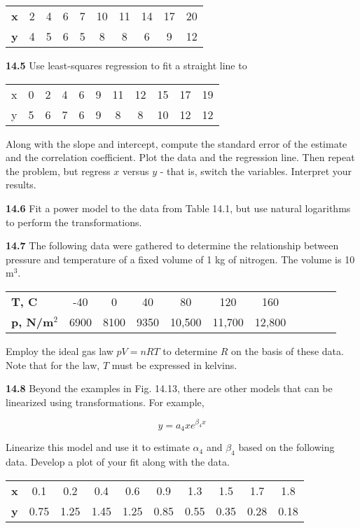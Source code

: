 \documentclass[../main.tex]{subfiles}
\begin{document}
\begin{multicols}{2}
	\noindent \begin{tabular}{c c c c c c c c c c }
	 	\textbf{x} & 2 & 4 & 6 & 7 & 10 & 11 & 		14 & 		17 & 		20 \\
	  	\textbf{y} & 4 & 5 & 6 & 5 & 8 & 8 & 6 & 9 & 		12
	\end{tabular}

	\noindent\textbf{14.5} Use least-squares regression to fit a straight line to

	\noindent \begin{tabular}{c c c c c c c c c c c  }
 		x & 0 & 2 & 4 & 6 & 9 & 11 & 12 & 15 & 17 & 19 \\
 		y & 5 & 6 & 7 & 6 & 9 & 8 & 8 & 10 & 12 & 12
   	\end{tabular}

   	\noindent Along with the slope and intercept, compute the standard
	   error of the estimate and the correlation coefficient. Plot the
	   data and the regression line. Then repeat the problem, but
	   regress $x$ versus $y$ - that is, switch the variables. Interpret
	   your results.

	\noindent\textbf{14.6} Fit a power model to the data from Table 14.1, but use
	natural logarithms to perform the transformations.

	\noindent\textbf{14.7} The following data were gathered to determine the
	relationship between pressure and temperature of a fixed
	volume of 1 kg of nitrogen. The volume is 10 m$^3$.

	\noindent \begin{tabular}{l c c c c c c c c c c  }
		\textbf{T, \textdegree C} & -40 & 0 & 40 & 80 & 120 & 160 \\
		\textbf{p, N/m$^2$} & 6900 & 8100 & 9350 & 10,500 & 11,700 & 12,800
  	\end{tabular}

	\noindent Employ the ideal gas law $pV = nRT$ to determine $R$ on the
	basis of these data. Note that for the law, $T$ must be expressed
	in kelvins.

	\noindent\textbf{14.8} Beyond the examples in Fig. 14.13, there are other
	models that can be linearized using transformations. For
	example,

	$$y = a_4 x e^{\beta_4 x}$$

	\noindent Linearize this model and use it to estimate $\alpha_4$ and $\beta_4$ based
	on the following data. Develop a plot of your fit along with
	the data.

	\noindent \begin{tabular}{c c c c c c c c c c}
		\textbf{x} & 0.1 & 0.2 & 0.4 & 0.6 & 0.9 & 1.3 & 1.5 & 1.7 & 1.8 \\
		\textbf{y} & 0.75 & 1.25 & 1.45 & 1.25 & 0.85 & 0.55 & 0.35 & 0.28 & 0.18	
  	\end{tabular}


\end{multicols}
\end{document}
